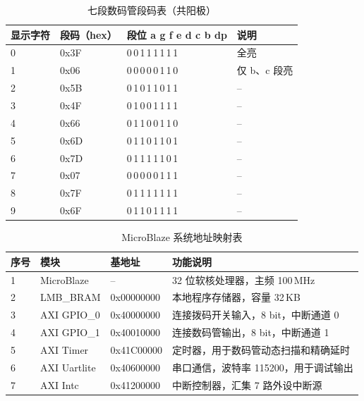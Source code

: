 \documentclass[a4paper,12pt]{article}
\begin{document}
\begin{table}[htbp]
    \centering
    \caption{七段数码管段码表（共阳极）}
    \label{tab:seg-table}
    \small
    \renewcommand{\arraystretch}{1.2}
    \begin{tabular}{@{}p{2cm} p{2.5cm} p{5cm} p{3.5cm}@{}}
        \toprule
        \bfseries 显示字符 & \bfseries 段码（hex） & \bfseries 段位 a g f e d c b dp & \bfseries 说明 \\\midrule
        0 & 0x3F & 0\,0\,1\,1\,1\,1\,1\,1 & 全亮 \\
        1 & 0x06 & 0\,0\,0\,0\,0\,1\,1\,0 & 仅 b、c 段亮 \\
        2 & 0x5B & 0\,1\,0\,1\,1\,0\,1\,1 & -- \\
        3 & 0x4F & 0\,1\,0\,0\,1\,1\,1\,1 & -- \\
        4 & 0x66 & 0\,1\,1\,0\,0\,1\,1\,0 & -- \\
        5 & 0x6D & 0\,1\,1\,0\,1\,1\,0\,1 & -- \\
        6 & 0x7D & 0\,1\,1\,1\,1\,1\,0\,1 & -- \\
        7 & 0x07 & 0\,0\,0\,0\,0\,1\,1\,1 & -- \\
        8 & 0x7F & 0\,1\,1\,1\,1\,1\,1\,1 & -- \\
        9 & 0x6F & 0\,1\,1\,0\,1\,1\,1\,1 & -- \\\bottomrule
    \end{tabular}
\end{table}

\begin{table}[htbp]
    \centering
    \caption{MicroBlaze 系统地址映射表}
    \label{tab:addr-map}
    \small
    \renewcommand{\arraystretch}{1.2}
    \begin{tabular}{@{}p{1.2cm} p{3cm} >{\ttfamily} p{3.2cm} p{5.5cm}@{}}
        \toprule
        \bfseries 序号 & \bfseries 模块 & \bfseries 基地址 & \bfseries 功能说明 \\\midrule
        1 & MicroBlaze   & --          & 32 位软核处理器，主频 100\,MHz \\
        2 & LMB\_BRAM    & 0x00000000  & 本地程序存储器，容量 32\,KB \\
        3 & AXI GPIO\_0  & 0x40000000  & 连接拨码开关输入，8 bit，中断通道 0 \\
        4 & AXI GPIO\_1  & 0x40010000  & 连接数码管输出，8 bit，中断通道 1 \\
        5 & AXI Timer    & 0x41C00000  & 定时器，用于数码管动态扫描和精确延时 \\
        6 & AXI Uartlite & 0x40600000  & 串口通信，波特率 115200，用于调试输出 \\
        7 & AXI Intc     & 0x41200000  & 中断控制器，汇集 7 路外设中断源 \\\bottomrule
    \end{tabular}
\end{table}
\end{document}

